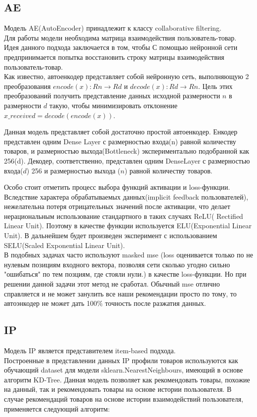 \documentclass[14pt]{mmcs_article}
\begin{document}
\subsection{AE}
Модель AE(AutoEncoder) принадлежит к классу collaborative filtering. \\

Для работы модели необходима матрица взаимодействия пользователь-товар. Идея данного подхода заключается в том, чтобы С помощью нейронной сети предпринимается попытка восстановить строку матрицы взаимодействия пользователь-товар.\cite{AEA1} \\

Как известно, автоенкодер представляет собой нейронную сеть, выполняющую 2 преобразования  $encode(x) : Rn \rightarrow Rd$ и $decode(x) : Rd \rightarrow Rn$. Цель этих преобразований получить представление данных исходной размерности $n$ в размерности $d$ такую, чтобы минимизировать отклонение $x\_received =decode(encode(x))$.

Данная модель представляет собой достаточно простой автоенкодер. Енкодер представлен одним Dense Layer с размерностью входа(n) равной количеству товаров, и размерностью выхода(Bottleneck) экспериментально подобранной как 256(d). Декодер, соответственно, представлен одним DenseLayer с размерностью входа($d$) 256 и размерностью выхода ($n$) равной количеству товаров. 

Особо стоит отметить процесс выбора функций активации и loss-функции. Вследствие характера обрабатываемых данных(implicit feedback пользователей), нежелательна потеря отрицательных значений после активации, что делает нерациональным использование стандартного в таких случаях ReLU( Rectified Linear Unit). Поэтому в качестве функции используется ELU(Exponential Linear Unit). В дальнейшем будет произведен эксперимент с использованием SELU(Scaled Exponential Linear Unit).\\

В подобных задачах часто используют masked mse (loss оценивается только по не нулевым позициям входного вектора, позволяя сети сколько угодно сильно "ошибаться" по тем позциям, где стояли нули.) в качестве loss-функции.  Но при решении данной задачи этот метод не сработал. Обычный mse отлично справляется и не может занулить все наши рекомендации просто по тому, то автоэнкодер не может дать 100\% точность после разжатия данных.


\subsection{IP}
Модель IP является представителем item-based подхода. \\
Построенные в представлении данных IP профили товаров используются как обучающий dataset для модели sklearn.NearestNeighbours, имеющий в основе алгоритм KD-Tree. Данная модель позволяет как рекомендовать товары, похожие на данный, так и рекомендовать товары на основе истории пользователя.  
В случае рекомендаций товаров на основе истории взаимодействий пользователя, применяется следующий алгоритм:
\end{document}

